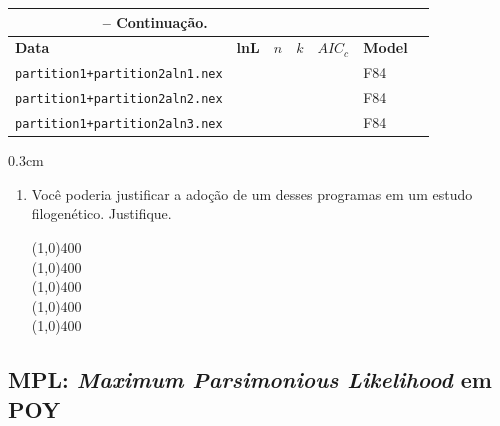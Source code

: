 \begin{refsection}
\begin{center}
\begin{longtable}{|l|>{\centering}m{2cm}|>{\centering}m{1cm}|c|>{\centering}m{2cm}|>{\centering}m{2cm} |@{}m{0pt}@{}}
\multicolumn{3}{c}{{\bfseries \tablename\ \thetable{} -- Continuação.}}\\
\hline\hline \textbf{Data} & \textbf{lnL}  & \textbf{$n$} & \textbf{$k$} & \textbf{$AIC_{c}$} & \textbf{Model} &\\
\endhead
\hline \hline
\endlastfoot
\hline \scriptsize\texttt{partition1+partition2aln1.nex} & & & & & F84 &\\
\hline \scriptsize\texttt{partition1+partition2aln2.nex} & & & & & F84 &\\
\hline \scriptsize\texttt{partition1+partition2aln3.nex} & & & & & F84 &\\
\end{longtable}
\end{center}



\begin {myindentpar}{0.3cm}
\begin{enumerate}[\itshape 1.]

	\item{Você poderia justificar a adoção de um desses programas em um estudo filogenético. Justifique.}

\begin{center}
\line(1,0){400}\\
\line(1,0){400}\\
\line(1,0){400}\\
\line(1,0){400}\\
\line(1,0){400}\\
\end{center}

\end{enumerate}
\end{myindentpar}





\subsection{\textbf{MPL}: \textit{Maximum Parsimonious Likelihood} em POY}\label{tut13:ml:mpl}


\end{refsection}
